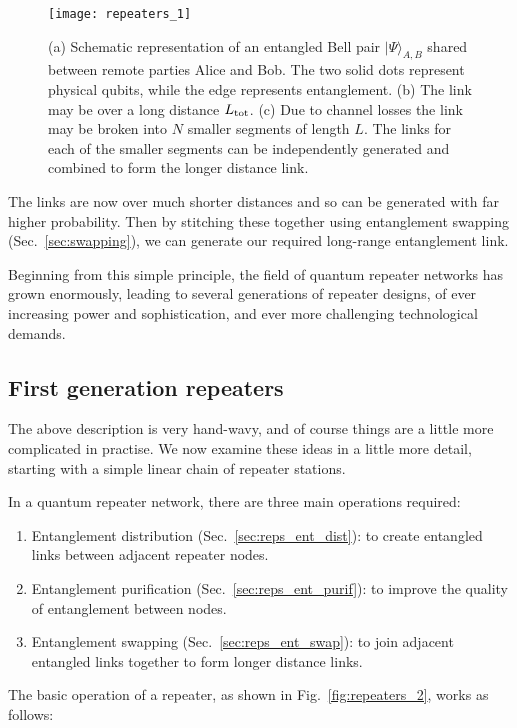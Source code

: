 \begin{figure}[!htb]
\texttt{[image: repeaters\_1]}
\caption{(a) Schematic representation of an entangled Bell pair $| \Psi\rangle_{A,B}$ shared between remote parties Alice and Bob. The two solid dots represent physical qubits, while the edge represents entanglement. (b) The link may be over a long distance $L_{\rm tot}$. (c) Due to channel losses the link may be broken into $N$ smaller segments of length $L$. The links for each of the smaller segments can be independently generated and combined to form the longer distance link.} 
\label{fig:repeaters_1}
\end{figure} 

The links are now over much shorter distances and so can be generated with far higher probability. Then by stitching these together using entanglement swapping (Sec.~\ref{sec:swapping}), we can generate our required long-range entanglement link.

Beginning from this simple principle, the field of quantum repeater networks has grown enormously, leading to several generations of repeater designs, of ever increasing power and sophistication, and ever more challenging technological demands.

\subsection{First generation repeaters}

The above description is very hand-wavy, and of course things are a little more complicated in practise. We now examine these ideas in a little more detail, starting with a simple linear chain of repeater stations. 

In a quantum repeater network, there are three main operations required:
\begin{enumerate}
\item Entanglement distribution (Sec.~\ref{sec:reps_ent_dist}): to create entangled links between adjacent repeater nodes.
\item Entanglement purification (Sec.~\ref{sec:reps_ent_purif}): to improve the quality of entanglement between nodes.
\item Entanglement swapping (Sec.~\ref{sec:reps_ent_swap}): to join adjacent entangled links together to form longer distance links.
\end{enumerate}
The basic operation of a repeater, as shown in Fig.~\ref{fig:repeaters_2}, works as follows:

